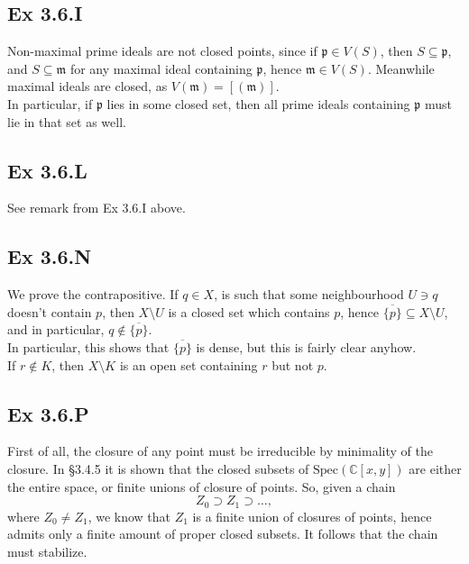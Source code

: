 \documentclass{article}
\theoremstyle{definition}
\newcommand{\C}{\mathbb{C}}
\newcommand{\Spec}{\text{Spec}}
\begin{document}
\subsection*{Ex 3.6.I}

Non-maximal prime ideals are not closed points, since if $\mathfrak{p} \in
V(S)$, then $S \subseteq \mathfrak{p}$, and $S \subseteq \mathfrak{m}$ for any
maximal ideal containing $\mathfrak{p}$, hence $\mathfrak{m} \in V(S)$.
Meanwhile maximal ideals are closed, as $V(\mathfrak{m}) = [(\mathfrak{m})]$. \\

In particular, if $\mathfrak{p}$ lies in some closed set, then all prime ideals
containing $\mathfrak{p}$ must lie in that set as well.

\subsection*{Ex 3.6.L}

See remark from Ex 3.6.I above.

\subsection*{Ex 3.6.N}

We prove the contrapositive. If $q \in X$, is such that some neighbourhood $U
\ni q$ doesn't contain $p$, then $X \setminus U$ is a closed set which contains
$p$, hence $\overline{\{p\}} \subseteq X \setminus U$, and in particular, $q
\not \in \overline{\{p\}}$. \\

In particular, this shows that $\overline{\{p\}}$ is dense, but this is fairly
clear anyhow. \\

If $r \not \in K$, then $X \setminus K$ is an open set containing $r$ but not
$p$. 

\subsection*{Ex 3.6.P}

First of all, the closure of any point must be irreducible by minimality of the
closure. In §3.4.5 it is shown that the closed subsets of $\Spec(\C[x, y])$ are
either the entire space, or finite unions of closure of points. So, given a chain 
\[
	Z_0 \supset Z_1 \supset \ldots,
\] 
where $Z_0 \not = Z_1$, we know that $Z_1$ is a finite union of closures of
points, hence admits only a finite amount of proper closed subsets. It follows
that the chain must stabilize.
\end{document}
